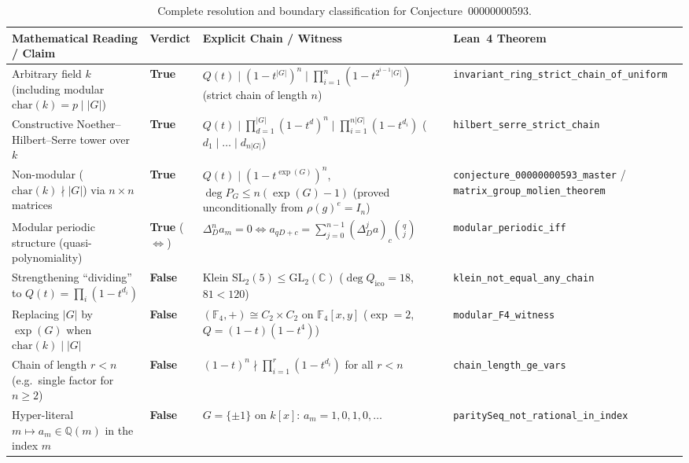 \documentclass[11pt]{article}
\theoremstyle{definition}
\theoremstyle{remark}
\begin{document}
\begin{table}[htbp]
\centering
\small
\begin{tabular}{@{}>{\raggedright\arraybackslash}p{4.2cm}>{\raggedright\arraybackslash}p{1.9cm}>{\raggedright\arraybackslash}p{4.9cm}>{\raggedright\arraybackslash}p{4.2cm}@{}}
\toprule
\textbf{Mathematical Reading / Claim} & \textbf{Verdict} & \textbf{Explicit Chain / Witness} & \textbf{Lean~4 Theorem} \\
\midrule
Arbitrary field $k$ (including modular $\mathrm{char}(k) = p \mid |G|$) & \textbf{True} & $Q(t) \mid (1 - t^{|G|})^n \mid \prod_{i=1}^{n} (1 - t^{2^{i-1}|G|})$ (strict chain of length $n$) & \texttt{invariant\_ring\_}\allowbreak\texttt{strict\_chain\_of\_uniform} \\
\addlinespace[3pt]
Constructive Noether--Hilbert--Serre tower over $k$ & \textbf{True} & $Q(t) \mid \prod_{d=1}^{|G|}(1-t^d)^n \mid \prod_{i=1}^{n|G|}(1-t^{d_i})$ ($d_1 \mid \dots \mid d_{n|G|}$) & \texttt{hilbert\_serre\_}\allowbreak\texttt{strict\_chain} \\
\addlinespace[3pt]
Non-modular ($\mathrm{char}(k) \nmid |G|$) via $n \times n$ matrices & \textbf{True} & $Q(t) \mid (1 - t^{\exp(G)})^n$, $\deg P_G \le n(\exp(G)-1)$ (proved unconditionally from $\rho(g)^e = I_n$) & \texttt{conjecture\_00000000593\_}\allowbreak\texttt{master} / \texttt{matrix\_group\_}\allowbreak\texttt{molien\_theorem} \\
\addlinespace[3pt]
Modular periodic structure (quasi-polynomiality) & \textbf{True} ($\Leftrightarrow$) & $\Delta_D^n a_m = 0 \iff a_{qD+c} = \sum_{j=0}^{n-1} (\Delta_D^j a)_c \binom{q}{j}$ & \texttt{modular\_periodic\_iff} \\
\addlinespace[3pt]
Strengthening ``dividing'' to $Q(t) = \prod_i (1 - t^{d_i})$ & \textbf{False} & Klein $\mathrm{SL}_2(5) \le \mathrm{GL}_2(\mathbb{C})$ ($\deg Q_{\mathrm{ico}} = 18$, $81 < 120$) & \texttt{klein\_not\_equal\_}\allowbreak\texttt{any\_chain} \\
\addlinespace[3pt]
Replacing $|G|$ by $\exp(G)$ when $\mathrm{char}(k) \mid |G|$ & \textbf{False} & $(\mathbb{F}_4,+) \cong C_2 \times C_2$ on $\mathbb{F}_4[x,y]$ ($\exp = 2$, $Q = (1-t)(1-t^4)$) & \texttt{modular\_F4\_witness} \\
\addlinespace[3pt]
Chain of length $r < n$ (e.g.\ single factor for $n \ge 2$) & \textbf{False} & $(1-t)^n \nmid \prod_{i=1}^r (1-t^{d_i})$ for all $r < n$ & \texttt{chain\_length\_ge\_vars} \\
\addlinespace[3pt]
Hyper-literal $m \mapsto a_m \in \mathbb{Q}(m)$ in the index $m$ & \textbf{False} & $G = \{\pm 1\}$ on $k[x]$: $a_m = 1,0,1,0,\dots$ & \texttt{paritySeq\_not\_}\allowbreak\texttt{rational\_in\_index} \\
\bottomrule
\end{tabular}
\caption{Complete resolution and boundary classification for Conjecture~00000000593.}
\label{tab:summary}
\end{table}
\end{document}
